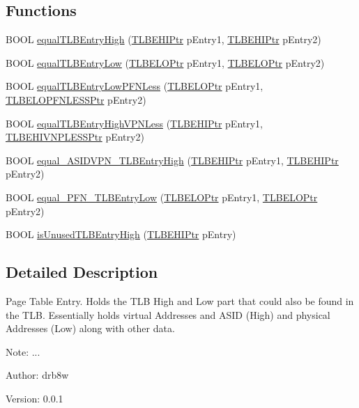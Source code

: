 \subsection*{Functions}
\begin{CompactItemize}
\item 
BOOL \hyperlink{group___v_m_m___p_t_e_gb048909cf624c30137211a111e947112}{equalTLBEntryHigh} (\hyperlink{struct_t_l_b_e_h_i}{TLBEHIPtr} pEntry1, \hyperlink{struct_t_l_b_e_h_i}{TLBEHIPtr} pEntry2)
\item 
BOOL \hyperlink{group___v_m_m___p_t_e_gae1fa5dc951be8567919098dbb0d3255}{equalTLBEntryLow} (\hyperlink{struct_t_l_b_e_l_o}{TLBELOPtr} pEntry1, \hyperlink{struct_t_l_b_e_l_o}{TLBELOPtr} pEntry2)
\item 
BOOL \hyperlink{group___v_m_m___p_t_e_g39d9945124ca0c249463753e6e67716b}{equalTLBEntryLowPFNLess} (\hyperlink{struct_t_l_b_e_l_o}{TLBELOPtr} pEntry1, \hyperlink{struct_t_l_b_e_l_o_p_f_n_l_e_s_s}{TLBELOPFNLESSPtr} pEntry2)
\item 
BOOL \hyperlink{group___v_m_m___p_t_e_gd1c7bd735d03446658cc746c07187839}{equalTLBEntryHighVPNLess} (\hyperlink{struct_t_l_b_e_h_i}{TLBEHIPtr} pEntry1, \hyperlink{struct_t_l_b_e_h_i_v_n_p_l_e_s_s}{TLBEHIVNPLESSPtr} pEntry2)
\item 
BOOL \hyperlink{group___v_m_m___p_t_e_g9903712483c2afdfad28dcca0768115f}{equal\_\-ASIDVPN\_\-TLBEntryHigh} (\hyperlink{struct_t_l_b_e_h_i}{TLBEHIPtr} pEntry1, \hyperlink{struct_t_l_b_e_h_i}{TLBEHIPtr} pEntry2)
\item 
BOOL \hyperlink{group___v_m_m___p_t_e_g58ccb6826bcf8c712b7c69d18b928f7e}{equal\_\-PFN\_\-TLBEntryLow} (\hyperlink{struct_t_l_b_e_l_o}{TLBELOPtr} pEntry1, \hyperlink{struct_t_l_b_e_l_o}{TLBELOPtr} pEntry2)
\item 
BOOL \hyperlink{group___v_m_m___p_t_e_g89cd5f7eaa1cd827f630285c9a56443c}{isUnusedTLBEntryHigh} (\hyperlink{struct_t_l_b_e_h_i}{TLBEHIPtr} pEntry)
\end{CompactItemize}


\subsection{Detailed Description}
Page Table Entry. Holds the TLB High and Low part that could also be found in the TLB. Essentially holds virtual Addresses and ASID (High) and physical Addresses (Low) along with other data. 

\begin{Desc}
\item[Note:]... \end{Desc}
\begin{Desc}
\item[Author:]drb8w \end{Desc}
\begin{Desc}
\item[Version:]0.0.1 \end{Desc}


